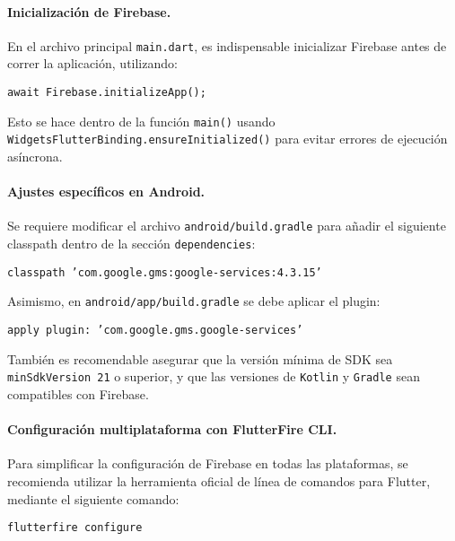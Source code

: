 \paragraph{Inicialización de Firebase.}  
En el archivo principal \texttt{main.dart}, es indispensable inicializar Firebase antes de correr la aplicación, utilizando:

\begin{center}
  \texttt{await Firebase.initializeApp();}
\end{center}

Esto se hace dentro de la función \texttt{main()} usando \texttt{WidgetsFlutterBinding.ensureInitialized()} para evitar errores de ejecución asíncrona.

\vspace{1em}

\paragraph{Ajustes específicos en Android.}  
Se requiere modificar el archivo \texttt{android/build.gradle} para añadir el siguiente classpath dentro de la sección \texttt{dependencies}:

\begin{center}
  \texttt{classpath 'com.google.gms:google-services:4.3.15'}
\end{center}

Asimismo, en \texttt{android/app/build.gradle} se debe aplicar el plugin:

\begin{center}
  \texttt{apply plugin: 'com.google.gms.google-services'}
\end{center}

También es recomendable asegurar que la versión mínima de SDK sea \texttt{minSdkVersion 21} o superior, y que las versiones de \texttt{Kotlin} y \texttt{Gradle} sean compatibles con Firebase.

\vspace{1em}

\paragraph{Configuración multiplataforma con FlutterFire CLI.}  
Para simplificar la configuración de Firebase en todas las plataformas, se recomienda utilizar la herramienta oficial de línea de comandos para Flutter, mediante el siguiente comando:

\begin{center}
  \texttt{flutterfire configure}
\end{center}


